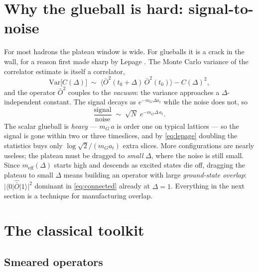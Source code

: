 \documentclass[11pt,a4paper]{article}
\newcommand{\Obar}{\bar{O}}
\newcommand{\meff}{m_{\mathrm{eff}}}
\newcommand{\at}{a_t}
\begin{document}
\section{Why the glueball is hard: signal-to-noise}
\label{sec:snr}

For most hadrons the plateau window is wide. For glueballs it is a crack in
the wall, for a reason first made sharp by Lepage \cite{Lepage1989}. The Monte
Carlo variance of the correlator estimate is itself a correlator,
\begin{equation}
  \mathrm{Var}\big[ C(\Delta) \big]
  \;\sim\;
  \big\langle \Obar^2(t_0{+}\Delta)\, \Obar^2(t_0) \big\rangle - C(\Delta)^2 ,
\end{equation}
and the operator $\Obar^2$ couples to the \emph{vacuum}: the variance
approaches a $\Delta$-independent constant. The signal decays as
$e^{-m_G\Delta \at}$ while the noise does not, so
\begin{equation}
  \frac{\text{signal}}{\text{noise}}
  \;\sim\;
  \sqrt{N}\; e^{-m_G \Delta\, \at} .
  \label{eq:lepage}
\end{equation}
The scalar glueball is \emph{heavy} --- $m_G\, a$ is order one on typical
lattices --- so the signal is gone within two or three timeslices, and by
\eqref{eq:lepage} doubling the statistics buys only $\log\sqrt2/(m_G \at)$
extra slices. More configurations are nearly useless; the plateau must be
dragged to \emph{small} $\Delta$, where the noise is still small. Since
$\meff(\Delta)$ starts high and descends as excited states die off, dragging
the plateau to small $\Delta$ means building an operator with large
\emph{ground-state overlap}: $|\langle 0|\hat{\bar O}|1\rangle|^2$ dominant in
\eqref{eq:connected} already at $\Delta=1$. Everything in the next section is
a technique for manufacturing overlap.

\section{The classical toolkit}
\label{sec:toolkit}

\subsection{Smeared operators}
\label{sec:smearing}
\end{document}
